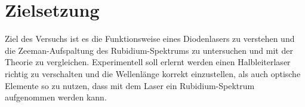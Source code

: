 \section{Zielsetzung}
Ziel des Versuchs ist es die Funktionsweise eines Diodenlasers zu verstehen und die Zeeman-Aufspaltung des Rubidium-Spektrums zu untersuchen
und mit der Theorie zu vergleichen. Experimentell soll erlernt werden einen Halbleiterlaser richtig zu verschalten und die Wellenlänge korrekt einzustellen, 
als auch optische Elemente so zu nutzen, dass mit dem Laser ein Rubidium-Spektrum aufgenommen werden kann.